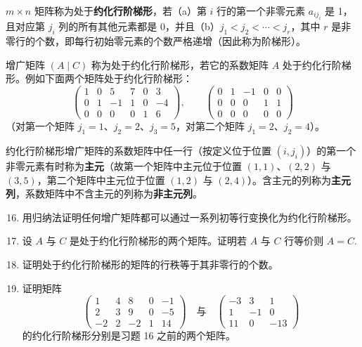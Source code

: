 \noindent \(m \times n\) 矩阵称为处于\textbf{约化行阶梯形}，若（a）第 \(i\) 行的第一个非零元素 \(a_{ij_i}\) 是 1，且对应第 \(j_i\) 列的所有其他元素都是 0，并且（b）\(j_1 < j_2 < \cdots < j_r\)，其中 \(r\) 是非零行的个数，即每行初始零元素的个数严格递增（因此称为阶梯形）。

增广矩阵 \((A \mid C)\) 称为处于约化行阶梯形，若它的系数矩阵 \(A\) 处于约化行阶梯形。例如下面两个矩阵处于约化行阶梯形：
\[
\begin{pmatrix} 1 & 0 & 5 & 7 & 0 & 3 \\ 0 & 1 & -1 & 1 & 0 & -4 \\ 0 & 0 & 0 & 0 & 1 & 6 \end{pmatrix}, \qquad \begin{pmatrix} 0 & 1 & -1 & 0 & 0 \\ 0 & 0 & 0 & 1 & 1 \\ 0 & 0 & 0 & 0 & 0 \end{pmatrix}
\]
（对第一个矩阵 \(j_1 = 1\)、\(j_2 = 2\)、\(j_3 = 5\)，对第二个矩阵 \(j_1 = 2\)、\(j_2 = 4\)）。

约化行阶梯形增广矩阵的系数矩阵中任一行（按定义位于位置 \((i, j_i)\)）的第一个非零元素有时称为\textbf{主元}（故第一个矩阵中主元位于位置 \((1,1)\)、\((2,2)\) 与 \((3,5)\)，第二个矩阵中主元位于位置 \((1,2)\) 与 \((2,4)\)）。含主元的列称为\textbf{主元列}，系数矩阵中不含主元的列称为\textbf{非主元列}。

\begin{enumerate}
\setcounter{enumi}{15}
\item 用归纳法证明任何增广矩阵都可以通过一系列初等行变换化为约化行阶梯形。

\item 设 \(A\) 与 \(C\) 是处于约化行阶梯形的两个矩阵。证明若 \(A\) 与 \(C\) 行等价则 \(A = C\).

\item 证明处于约化行阶梯形的矩阵的行秩等于其非零行的个数。

\item 证明矩阵
\[
\begin{pmatrix} 1 & 4 & 8 & 0 & -1 \\ 2 & 3 & 9 & 0 & -5 \\ -2 & 2 & -2 & 1 & 14 \end{pmatrix}
\quad \text{与} \quad
\begin{pmatrix} -3 & 3 & 1 \\ 1 & -1 & 0 \\ 11 & 0 & -13 \end{pmatrix}
\]
的约化行阶梯形分别是习题 16 之前的两个矩阵。
\end{enumerate}

